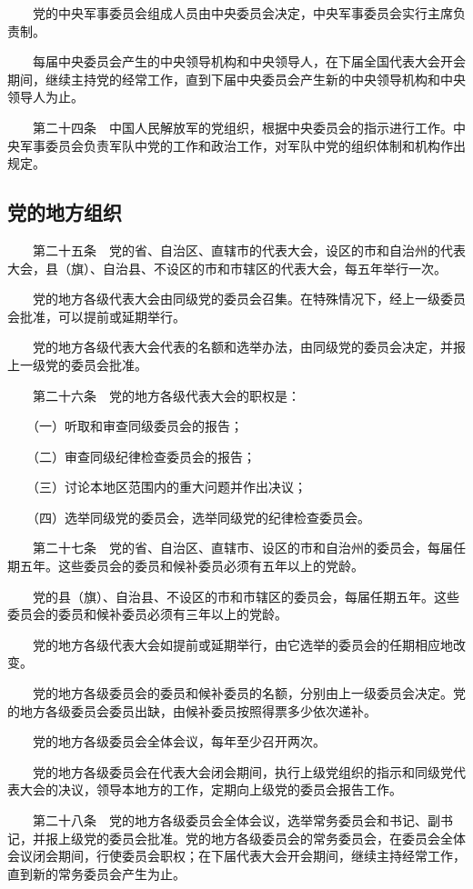 　　党的中央军事委员会组成人员由中央委员会决定，中央军事委员会实行主席负责制。

　　每届中央委员会产生的中央领导机构和中央领导人，在下届全国代表大会开会期间，继续主持党的经常工作，直到下届中央委员会产生新的中央领导机构和中央领导人为止。

　　第二十四条　中国人民解放军的党组织，根据中央委员会的指示进行工作。中央军事委员会负责军队中党的工作和政治工作，对军队中党的组织体制和机构作出规定。

    \subsection{党的地方组织}
　　第二十五条　党的省、自治区、直辖市的代表大会，设区的市和自治州的代表大会，县（旗）、自治县、不设区的市和市辖区的代表大会，每五年举行一次。

　　党的地方各级代表大会由同级党的委员会召集。在特殊情况下，经上一级委员会批准，可以提前或延期举行。

　　党的地方各级代表大会代表的名额和选举办法，由同级党的委员会决定，并报上一级党的委员会批准。

　　第二十六条　党的地方各级代表大会的职权是：

　　（一）听取和审查同级委员会的报告；

　　（二）审查同级纪律检查委员会的报告；

　　（三）讨论本地区范围内的重大问题并作出决议；

　　（四）选举同级党的委员会，选举同级党的纪律检查委员会。

　　第二十七条　党的省、自治区、直辖市、设区的市和自治州的委员会，每届任期五年。这些委员会的委员和候补委员必须有五年以上的党龄。

　　党的县（旗）、自治县、不设区的市和市辖区的委员会，每届任期五年。这些委员会的委员和候补委员必须有三年以上的党龄。

　　党的地方各级代表大会如提前或延期举行，由它选举的委员会的任期相应地改变。

　　党的地方各级委员会的委员和候补委员的名额，分别由上一级委员会决定。党的地方各级委员会委员出缺，由候补委员按照得票多少依次递补。

　　党的地方各级委员会全体会议，每年至少召开两次。

　　党的地方各级委员会在代表大会闭会期间，执行上级党组织的指示和同级党代表大会的决议，领导本地方的工作，定期向上级党的委员会报告工作。

　　第二十八条　党的地方各级委员会全体会议，选举常务委员会和书记、副书记，并报上级党的委员会批准。党的地方各级委员会的常务委员会，在委员会全体会议闭会期间，行使委员会职权；在下届代表大会开会期间，继续主持经常工作，直到新的常务委员会产生为止。

